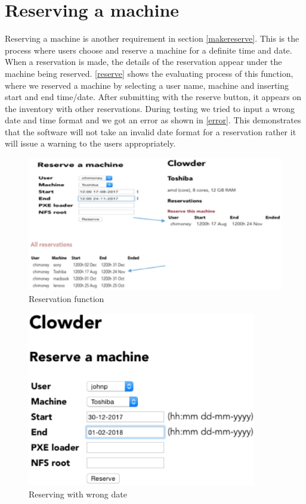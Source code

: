 \pagebreak
\section*{Reserving a machine}
Reserving a machine is another requirement in section \ref{makereserve}. This is the process where users choose and reserve a machine for a definite time and date. When a reservation is made, the details of the reservation appear under the machine being reserved. \autoref{reserve} shows the evaluating process of this function, where we reserved a machine by selecting a user name, machine and inserting start and end time/date. After submitting with the reserve button, it appears on the inventory with other reservations. During testing we tried to input a wrong date and time format and we got an error as shown in \autoref{error}. This demonstrates that the software will not take an invalid date format for a reservation rather it will issue a warning to the users appropriately.
\begin{figure}[h]
  \includegraphics[width=\linewidth]{reserve.eps}
  \caption{Reservation function}
  \label{reserve}
\end{figure}

\begin{figure}
\includegraphics[width=100mm, scale=0.5]{dateformat1.eps}
\caption{Reserving with wrong date}
\end{figure}


